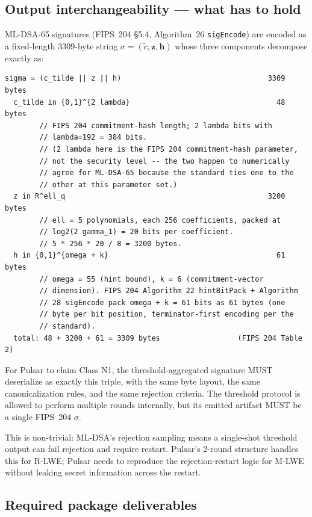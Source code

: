 \subsection{Output interchangeability --- what has to hold}

ML-DSA-65 signatures (FIPS~204 \S5.4, Algorithm~26 \texttt{sigEncode})
are encoded as a fixed-length 3309-byte string $\sigma = (\tilde c,
\mathbf{z}, \mathbf{h})$ whose three components decompose exactly as:

\begin{verbatim}
sigma = (c_tilde || z || h)                                  3309 bytes
  c_tilde in {0,1}^{2 lambda}                                  48 bytes
        // FIPS 204 commitment-hash length; 2 lambda bits with
        // lambda=192 = 384 bits.
        // (2 lambda here is the FIPS 204 commitment-hash parameter,
        // not the security level -- the two happen to numerically
        // agree for ML-DSA-65 because the standard ties one to the
        // other at this parameter set.)
  z in R^ell_q                                               3200 bytes
        // ell = 5 polynomials, each 256 coefficients, packed at
        // log2(2 gamma_1) = 20 bits per coefficient.
        // 5 * 256 * 20 / 8 = 3200 bytes.
  h in {0,1}^{omega + k}                                       61 bytes
        // omega = 55 (hint bound), k = 6 (commitment-vector
        // dimension). FIPS 204 Algorithm 22 hintBitPack + Algorithm
        // 28 sigEncode pack omega + k = 61 bits as 61 bytes (one
        // byte per bit position, terminator-first encoding per the
        // standard).
  total: 48 + 3200 + 61 = 3309 bytes                  (FIPS 204 Table 2)
\end{verbatim}

For Pulsar to claim Class N1, the threshold-aggregated signature
MUST deserialize as exactly this triple, with the same byte layout,
the same canonicalization rules, and the same rejection criteria.
The threshold protocol is allowed to perform multiple rounds
internally, but its emitted artifact MUST be a single FIPS~204
$\sigma$.

This is non-trivial: ML-DSA's rejection sampling means a single-shot
threshold output can fail rejection and require restart. Pulsar's
2-round structure handles this for R-LWE; Pulsar needs to
reproduce the rejection-restart logic for M-LWE without leaking
secret information across the restart.

\subsection{Required package deliverables}

